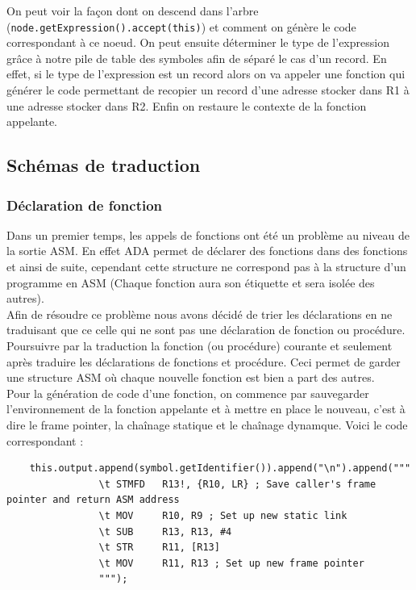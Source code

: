 \documentclass[french,a4paper]{article}
\begin{document}
    On peut voir la façon dont on descend dans l'arbre (\texttt{node.getExpression().accept(this)}) et comment on génère le code correspondant à ce noeud. On peut ensuite déterminer le type de l'expression grâce à notre pile de table des symboles afin de séparé le cas d'un record. En effet, si le type de l'expression est un record alors on va appeler une fonction qui générer le code permettant de recopier un record d'une adresse stocker dans R1 à une adresse stocker dans R2. Enfin on restaure le contexte de la fonction appelante.

    \subsection{Schémas de traduction}
    \subsubsection{Déclaration de fonction}

    Dans un premier temps, les appels de fonctions ont été un problème au niveau de la sortie ASM. En effet ADA permet de déclarer des fonctions dans des fonctions et ainsi de suite, cependant cette structure ne correspond pas à la structure d'un programme en ASM (Chaque fonction aura son étiquette et sera isolée des autres). \\
    Afin de résoudre ce problème nous avons décidé de trier les déclarations en ne traduisant que ce celle qui ne sont pas une déclaration de fonction ou procédure. Poursuivre par la traduction la fonction (ou procédure) courante et seulement après traduire les déclarations de fonctions et procédure. Ceci permet de garder une structure ASM où chaque nouvelle fonction est bien a part des autres. \\

    Pour la génération de code d'une fonction, on commence par sauvegarder l'environnement de la fonction appelante et à mettre en place le nouveau, c'est à dire le frame pointer, la chaînage statique et le chaînage dynamque. Voici le code correspondant :
    \begin{lstlisting}
    this.output.append(symbol.getIdentifier()).append("\n").append("""
                \t STMFD   R13!, {R10, LR} ; Save caller's frame pointer and return ASM address
                \t MOV     R10, R9 ; Set up new static link
                \t SUB     R13, R13, #4
                \t STR     R11, [R13]
                \t MOV     R11, R13 ; Set up new frame pointer
                """);
    \end{lstlisting}
\end{document}
